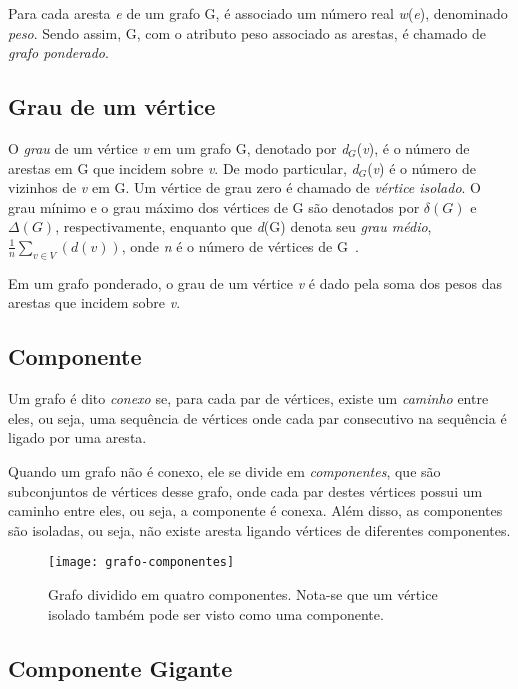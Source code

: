 Para cada aresta \emph{e} de um grafo G, é associado um número real \emph{w}(\emph{e}), denominado \emph{peso}. Sendo assim, G, com o atributo peso associado as arestas, é chamado de \emph{grafo ponderado}.

\subsection{Grau de um vértice}
\label{conceitos__grafo--grau}

\def \variable {\emph{v}}

O \emph{grau} de um vértice \emph{v} em um grafo G, denotado por \emph{d$_{G}$}(\emph{v}), é o número de arestas em G que incidem sobre \emph{v}. De modo particular, \emph{d$_{G}$}(\emph{v}) é o número de vizinhos de \emph{v} em G. Um vértice de grau zero é chamado de \emph{vértice isolado}. O grau mínimo e o grau máximo dos vértices de G são denotados por $\delta(G)$ e $\Delta(G)$, respectivamente, enquanto que \emph{d}(G) denota seu \emph{grau médio}, $\frac{1}{n}\sum_{v\in V}(d(v))$, onde \emph{n} é o número de vértices de G~\cite{bondy1976graph}.

Em um grafo ponderado, o grau de um vértice \emph{v} é dado pela soma dos pesos das arestas que incidem sobre \emph{v}.

\subsection{Componente}
\label{conceitos__grafo--componente}

Um grafo é dito \emph{conexo} se, para cada par de vértices, existe um \emph{caminho} entre eles, ou seja, uma sequência de vértices onde cada par consecutivo na sequência é ligado por uma aresta.

Quando um grafo não é conexo, ele se divide em \emph{componentes}, que são subconjuntos de vértices desse grafo, onde cada par destes vértices possui um caminho entre eles, ou seja, a componente é conexa. Além disso, as componentes são isoladas, ou seja, não existe aresta ligando vértices de diferentes componentes.

\begin{figure}[H]
    \texttt{[image: grafo-componentes]}
    \centering
    \caption{Grafo dividido em quatro componentes. Nota-se que um vértice isolado também pode ser visto como uma componente.}
\end{figure}

\subsection{Componente Gigante}
\label{conceitos__grafo--componente-gigante}

